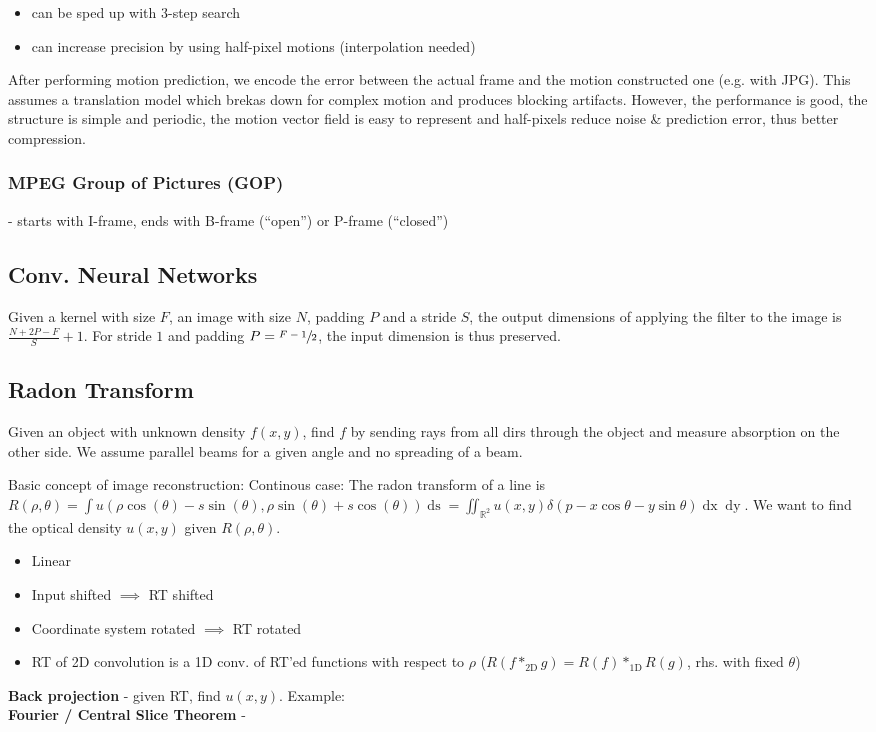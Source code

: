 \documentclass[a4paper,10pt]{article}
\begin{document}
\begin{itemize}
    \item can be sped up with 3-step search
    \item can increase precision by using half-pixel motions (interpolation needed)
\end{itemize}
After performing motion prediction, we encode the error between the actual frame and the motion constructed one (e.g. with JPG).
This assumes a translation model which brekas down for complex motion and produces blocking artifacts. However, the performance is good, the structure is simple and periodic, the motion vector field is easy to represent and half-pixels reduce noise \& prediction error, thus better compression.
\subsubsection{MPEG Group of Pictures (GOP)} - starts with I-frame, ends with B-frame (``open'') or P-frame (``closed'')

\subsection{Conv. Neural Networks}
Given a kernel with size \( F \), an image with size \( N \), padding \( P \) and a stride \( S \), the output dimensions of applying the filter to the image is \( \frac{N+2P-F}{S} + 1 \). For stride \( 1 \) and padding \( P = \sfrac{F-1}{2} \), the input dimension is thus preserved.

\subsection{Radon Transform}
Given an object with unknown density \( f(x,y) \), find \( f \) by sending rays from all dirs through the object and measure absorption on the other side. We assume parallel beams for a given angle and no spreading of a beam.

Basic concept of image reconstruction:
Continous case: The radon transform of a line is \( R(\rho , \theta) = \int u(\rho \cos (\theta ) - s \sin (\theta ), \rho \sin (\theta ) + s \cos (\theta )) \mathop{ds} = \iint_{\mathbb{R}^2} u(x,y) \delta (p - x \cos \theta - y \sin \theta ) \mathop{dx} \mathop{dy} \). We want to find the optical density \( u(x,y) \) given \( R(\rho , \theta ) \).

\begin{itemize}
    \item Linear
    \item Input shifted \( \implies \) RT shifted
    \item Coordinate system rotated \( \implies \) RT rotated
    \item RT of 2D convolution is a 1D conv. of RT'ed functions with respect to \( \rho \) (\( R(f*_\text{2D} g) = R(f) *_\text{1D} R(g) \), rhs. with fixed \( \theta  \))
\end{itemize}
\textbf{Back projection} - given RT, find \( u(x,y) \). Example: \\ %
\textbf{Fourier / Central Slice Theorem} - %
\end{document}
